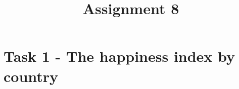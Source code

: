 \documentclass[a4paper]{article}
\date{}
\author{}
\title{\textbf{Assignment 8}}
\begin{document}
\maketitle 
\thispagestyle{fancy}

\section*{Task 1 - The happiness index by country}
 \\
\clearpage
\end{document}
